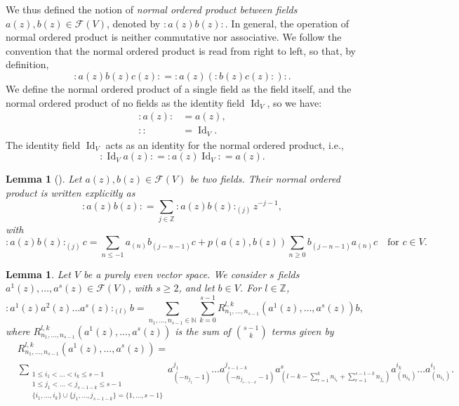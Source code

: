 \documentclass[a4paper, 12pt, reqno]{amsart}
\newtheorem{lemma}[theorem]{Lemma}
\theoremstyle{remark}
\DeclareMathOperator{\Id}{Id}
\begin{document}
We thus defined the notion of \emph{normal ordered product between fields $a(z), b(z) \in \mathcal{F}(V)$}, denoted by $:a(z)b(z):$.
In general, the operation of normal ordered product is neither commutative nor associative.
We follow the convention that the normal ordered product is read from right to left, so that, by definition,
\begin{equation*}
  :a(z)b(z)c(z): = :a(z)(:b(z)c(z):):.
\end{equation*}
We define the normal ordered product of a single field as the field itself, and the normal ordered product of no fields as the identity field $\Id_V$, so we have:
\begin{align*}
  :a(z): &= a(z), \\
  :: &= \Id_V.
\end{align*}
The identity field $\Id_V$ acts as an identity for the normal ordered product, i.e.,
\begin{equation*}
  :\Id_Va(z): = :a(z)\Id_V: = a(z).
\end{equation*}

\begin{lemma}[{\cite[Proposition 3.3.3]{nozaradan_introduction_2008}}]
  \label{lmm:2}
  Let $a(z), b(z) \in \mathcal{F}(V)$ be two fields.
  Their normal ordered product is written explicitly as
  \begin{equation*}
    :a(z)b(z): = \sum_{j \in \mathbb{Z}}:a(z)b(z):_{(j)}z^{-j - 1},
  \end{equation*}
  with
  \begin{equation*}
    :a(z)b(z):_{(j)}c = \sum_{n \le -1}a_{(n)}b_{(j - n - 1)}c + p(a(z), b(z))\sum_{n \ge 0}b_{(j - n - 1)}a_{(n)}c \quad \text{for $c \in V$}.
  \end{equation*}
\end{lemma}

\begin{lemma}
  \label{lmm:3}
  Let $V$ be a purely even vector space.
  We consider $s$ fields $a^1(z), \dots, a^s(z) \in \mathcal{F}(V)$, with $s \ge 2$, and let $b \in V$.
  For $l \in \mathbb{Z}$,
  \begin{equation*}
    :a^1(z)a^2(z)\dots a^s(z):_{(l)}b = \sum_{n_1, \dots, n_{s - 1} \in \mathbb{N}}\sum_{k = 0}^{s - 1}R^{l, k}_{n_1, \dots, n_{s - 1}}(a^1(z), \dots, a^s(z))b,
  \end{equation*}
  where $R^{l, k}_{n_1, \dots, n_{s - 1}}(a^1(z), \dots, a^s(z))$ is the sum of $\binom{s - 1}{k}$ terms given by
  \begin{align*}
    &R^{l, k}_{n_1, \dots, n_{s - 1}}(a^1(z), \dots, a^s(z)) = \\
    &\sum_{\substack{1 \le i_1 < \dots < i_k \le s - 1 \\ 1 \le j_1 < \dots < j_{s - 1 - k} \le s - 1 \\ \{i_1, \dots, i_k\} \cup \{j_1, \dots, j_{s - 1 - k}\} = \{1, \dots, s - 1\}}}a^{j_1}_{(-n_{j_1} - 1)}\dots a^{j_{s - 1 - k}}_{(-n_{j_{s - 1 - k}} - 1)}a^s_{(l - k - \sum_{r = 1}^kn_{i_r} + \sum_{r = 1}^{s - 1 - k}n_{j_r})}a^{i_k}_{(n_{i_k})}\dots a^{i_1}_{(n_{i_1})}.
  \end{align*}
\end{lemma}
\end{document}
